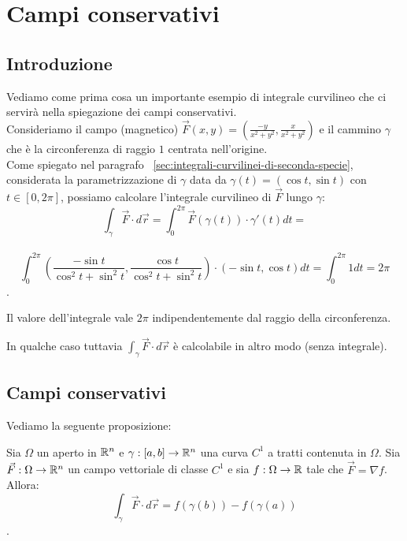 \chapter{Campi conservativi}

\section{Introduzione}\label{sec:introduzione}
Vediamo come prima cosa un importante esempio di integrale curvilineo che ci servirà nella spiegazione dei campi conservativi.\\
Consideriamo il campo (magnetico) $\vec F (x,y) = (\frac{-y}{x^2+y^2}, \frac{x}{x^2+y^2})$ e il cammino $\gamma$ che è la circonferenza di raggio $1$ centrata nell'origine.\\
Come spiegato nel paragrafo ~\ref{sec:integrali-curvilinei-di-seconda-specie}, considerata la parametrizzazione di $\gamma$ data da $\gamma(t) = (\cos t, \sin t)$ con $t \in [0, 2\pi]$, possiamo calcolare l'integrale curvilineo di $\vec F$ lungo $\gamma$:
$$\int_\gamma \vec F \cdot d\vec r = \int_0^{2\pi} \vec F(\gamma(t)) \cdot \gamma'(t) dt =$$\\
$$\int_0^{2\pi} \left( \frac{-\sin t}{\cos^2 t + \sin^2 t}, \frac{\cos t}{\cos^2 t + \sin^2 t} \right) \cdot (-\sin t, \cos t) dt = \int_0^{2\pi} 1 dt =2\pi$$.

\begin{osservazione}{}
  Il valore dell'integrale vale $2\pi$ indipendentemente dal raggio della circonferenza.\\
\end{osservazione}

In qualche caso tuttavia $\int_\gamma \vec F \cdot d\vec r$ è calcolabile in altro modo (senza integrale).\\

\section{Campi conservativi}
Vediamo la seguente proposizione:

\begin{teorema}{}
  Sia $\Omega$ un aperto in $\mathbb{R}^n$ e $\gamma: [a,b] \rightarrow \mathbb{R}^n$ una curva $C^1$ a tratti contenuta in $\Omega$. Sia $\vec F: \Omega \rightarrow \mathbb{R}^n$ un campo vettoriale di classe $C^1$ e sia $f: \Omega \rightarrow \mathbb{R}$ tale che $\vec F = \nabla f$. Allora:
  $$\int_\gamma \vec F \cdot d\vec r = f(\gamma(b)) - f(\gamma(a))$$.
\end{teorema}

